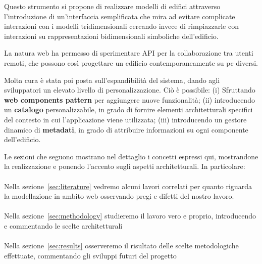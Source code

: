 Questo strumento si propone di realizzare modelli di edifici attraverso l'introduzione di un'interfaccia semplificata che mira ad evitare complicate interazioni con i modelli tridimensionali cercando invece di rimpiazzarle con interazioni su rappresentazioni bidimensionali simboliche dell'edificio.

La natura web ha permesso di sperimentare API per la collaborazione tra utenti remoti, che possono cos\`i progettare un edificio contemporaneamente su pc diversi.

Molta cura \`e stata poi posta sull'espandibilit\`a del sistema, dando agli sviluppatori un elevato livello di personalizzazione. Ci\`o \`e possibile: (i) Sfruttando \textbf{web components pattern} per aggiungere nuove funzionalità; (ii) introducendo un \textbf{catalogo} personalizzabile, in grado di fornire elementi architetturali specifici del contesto in cui l'applicazione viene utilizzata; (iii) introducendo un gestore dinamico di \textbf{metadati}, in grado di 
attribuire informazioni su ogni componente dell'edificio.

Le sezioni che seguono mostrano nel dettaglio i concetti espressi qui, mostrandone la realizzazione e ponendo l'accento sugli aspetti architetturali. In particolare:\\\\
Nella sezione~\ref{sec:literature} vedremo alcuni lavori correlati per quanto riguarda la modellazione in ambito web osservando pregi e difetti del nostro lavoro.\\\\
Nella sezione~\ref{sec:methodology} studieremo il lavoro vero e proprio, introducendo e commentando le scelte architetturali\\\\
Nella sezione~\ref{sec:results} osserveremo il risultato delle scelte metodologiche effettuate, commentando gli sviluppi futuri del progetto\\\\